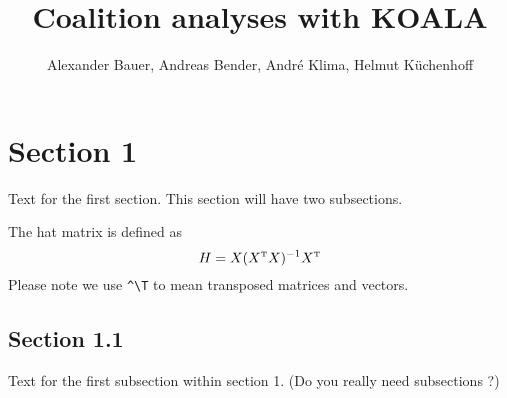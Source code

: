 \documentclass[twoside]{report}
\begin{document}

\title{Coalition analyses with KOALA}

\author{Alexander Bauer, Andreas Bender, Andr\'e Klima, Helmut K\"{u}chenhoff}





\maketitle



\section{Section 1}
Text for the first section. This section will have two subsections.

The hat matrix is defined as
$$
H=X(X^{ \mathrm{\scriptscriptstyle T} } X)^{-1}X^{ \mathrm{\scriptscriptstyle T} }
$$
Please note we use \verb|^\T| to mean transposed matrices and vectors.

\subsection{Section 1.1}
Text for the first subsection within section 1. (Do you really need subsections ?)
\end{document}
